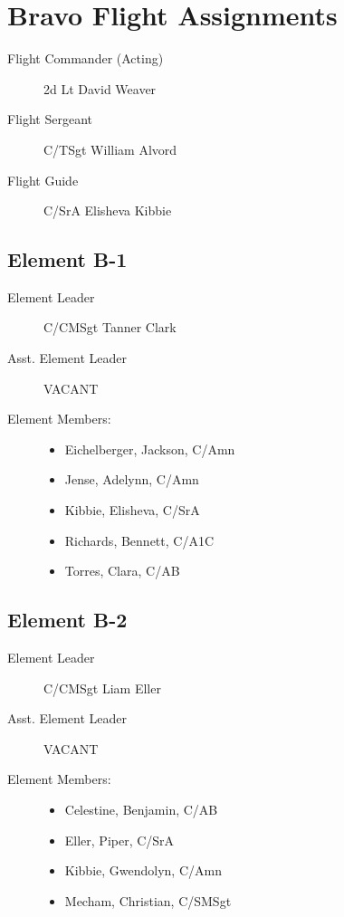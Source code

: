 \documentclass[12pt]{article}
\begin{document}
\section*{Bravo Flight Assignments}
\begin{description}
    \item[Flight Commander (Acting)] 2d Lt David Weaver
    \item[Flight Sergeant] C/TSgt William Alvord
    \item[Flight Guide] C/SrA Elisheva Kibbie

\end{description}
\begin{multicols}{3}
    \subsection*{Element B-1}
    \begin{description}
        \item[Element Leader] C/CMSgt Tanner Clark
        \item[Asst. Element Leader] VACANT
        \item[Element Members:]\hfill
        \begin{itemize}
            \item Eichelberger, Jackson, C/Amn
            \item Jense, Adelynn, C/Amn
            \item Kibbie, Elisheva, C/SrA
            \item Richards, Bennett, C/A1C
            \item Torres, Clara, C/AB
        \end{itemize}
    \end{description}

    \columnbreak

    \subsection*{Element B-2}
    \begin{description}
        \item[Element Leader] C/CMSgt Liam Eller
        \item[Asst. Element Leader] VACANT
        \item[Element Members:]\hfill
        \begin{itemize}
            \item Celestine, Benjamin, C/AB
            \item Eller, Piper, C/SrA
            \item Kibbie, Gwendolyn, C/Amn
            \item Mecham, Christian, C/SMSgt
        \end{itemize}
    \end{description}



\end{multicols}
\end{document}
